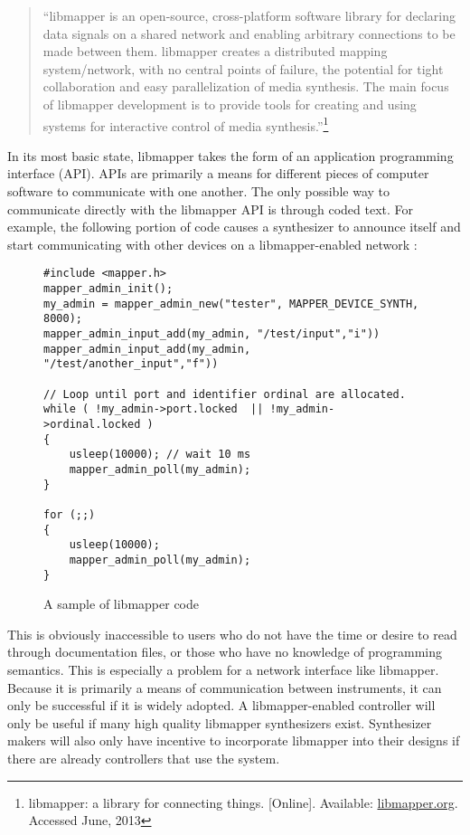 \begin{quote} 
``libmapper is an open-source, cross-platform software library for declaring data signals on a shared network and enabling arbitrary connections to be made between them. libmapper creates a distributed mapping system/network, with no central points of failure, the potential for tight collaboration and easy parallelization of media synthesis. The main focus of libmapper development is to provide tools for creating and using systems for interactive control of media synthesis.''\footnote{libmapper: a library for connecting things. [Online]. Available: \url{libmapper.org}. Accessed June, 2013}
\end{quote}

In its most basic state, libmapper takes the form of an application programming interface (API). APIs are primarily a means for different pieces of computer software to communicate with one another. The only possible way to communicate directly with the libmapper API is through coded text. For example, the following portion of code causes a synthesizer to announce itself and start communicating with other devices on a libmapper-enabled network :

\begin{figure}[h!]
\begin{lstlisting}[]
#include <mapper.h>
mapper_admin_init();
my_admin = mapper_admin_new("tester", MAPPER_DEVICE_SYNTH, 8000); 
mapper_admin_input_add(my_admin, "/test/input","i")) 
mapper_admin_input_add(my_admin, "/test/another_input","f"))

// Loop until port and identifier ordinal are allocated. 
while ( !my_admin->port.locked	|| !my_admin->ordinal.locked )
{
	usleep(10000); // wait 10 ms 
	mapper_admin_poll(my_admin);
}

for (;;) 
{
	usleep(10000);
	mapper_admin_poll(my_admin); 
}
\end{lstlisting}
\caption{A sample of libmapper code}
\end{figure}

This is obviously inaccessible to users who do not have the time or desire to read through documentation files, or those who have no knowledge of programming semantics. This is especially a problem for a network interface like libmapper. Because it is primarily a means of communication between instruments, it can only be successful if it is widely adopted. A libmapper-enabled controller will only be useful if many high quality libmapper synthesizers exist. Synthesizer makers will also only have incentive to incorporate libmapper into their designs if there are already controllers that use the system. 

